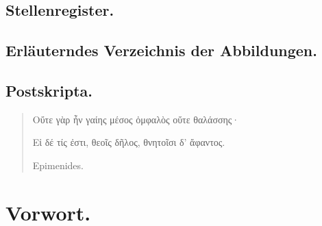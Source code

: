 \documentclass[a4paper, 11pt, oneside]{article}
\begin{document}
\subsection*{Stellenregister.}

\subsection*{Erläuterndes Verzeichnis der Abbildungen.}

\subsection*{Postskripta.}
\clearpage
\begin{quotation}
\normalsize
\begin{flushright}
Οὔτε γὰρ ἦν γαίης μέσος ὀμφαλὸς οὔτε θαλάσσης·

Εἰ δέ τίς ἐστι, θεοῖς δῆλος, θνητοῖσι δ' ἄφαντος.\hspace*{1em}

Epimenides.
\end{flushright}
\end{quotation}
\section*{Vorwort.}
\end{document}
